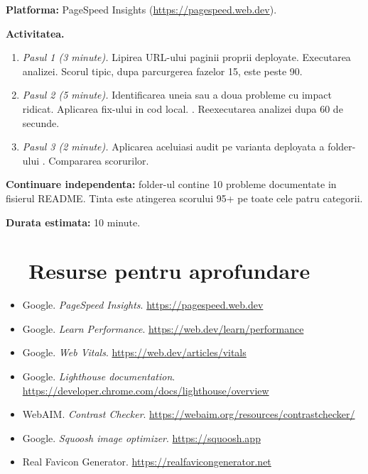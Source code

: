 \begin{joc}
\textbf{Platforma:} PageSpeed Insights (\url{https://pagespeed.web.dev}).

\medskip

\textbf{Activitatea.}
\begin{enumerate}[itemsep=1pt]
  \item \emph{Pasul 1 (3 minute).} Lipirea URL-ului paginii proprii deployate. Executarea analizei. Scorul tipic, dupa parcurgerea fazelor 1\textendash{}5, este peste 90.
  \item \emph{Pasul 2 (5 minute).} Identificarea uneia sau a doua probleme cu impact ridicat. Aplicarea fix-ului in cod local. . Reexecutarea analizei dupa 60 de secunde.
  \item \emph{Pasul 3 (2 minute).} Aplicarea aceluiasi audit pe varianta deployata a folder-ului . Compararea scorurilor.
\end{enumerate}

\textbf{Continuare independenta:} folder-ul  contine 10 probleme documentate in fisierul README. Tinta este atingerea scorului 95+ pe toate cele patru categorii.

\medskip

\textbf{Durata estimata:} 10 minute.
\end{joc}

\section*{\faGraduationCap\ \ Resurse pentru aprofundare}

\begin{itemize}[itemsep=2pt]
  \item Google. \emph{PageSpeed Insights}. \url{https://pagespeed.web.dev}
  \item Google. \emph{Learn Performance}. \url{https://web.dev/learn/performance}
  \item Google. \emph{Web Vitals}. \url{https://web.dev/articles/vitals}
  \item Google. \emph{Lighthouse documentation}. \url{https://developer.chrome.com/docs/lighthouse/overview}
  \item WebAIM. \emph{Contrast Checker}. \url{https://webaim.org/resources/contrastchecker/}
  \item Google. \emph{Squoosh image optimizer}. \url{https://squoosh.app}
  \item Real Favicon Generator. \url{https://realfavicongenerator.net}
\end{itemize}

\bigskip


